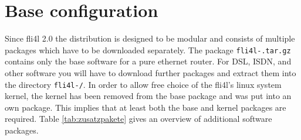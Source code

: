 
\chapter{Base configuration}

Since fli4l 2.0 the distribution is designed to be modular and consists of
multiple packages which have to be downloaded separately. The package
\texttt{fli4l-\version.tar.gz} contains only the base software for a pure ethernet
router. For DSL, ISDN, and other software you will have to download
further packages and extract them into the directory \texttt{fli4l-\version/}.
In order to allow free choice of the fli4l's linux system kernel, the
kernel has been removed from the base package and was put into an own package.
This implies that at least both the base and kernel packages are required.
Table \ref{tab:zusatzpakete} gives an overview of additional software
packages.

